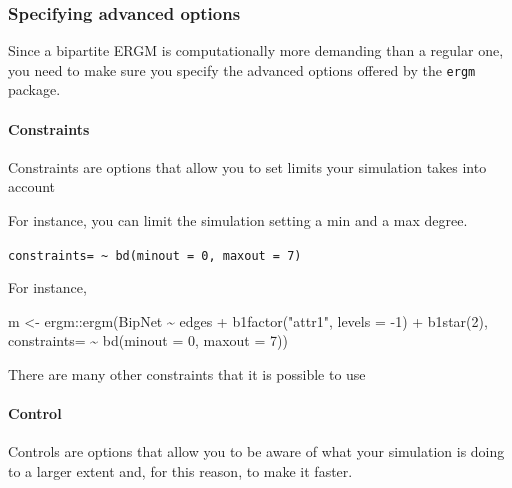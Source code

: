 \documentclass[
]{article}
\newenvironment{Shaded}{\begin{snugshade}}{\end{snugshade}}
\newcommand{\AttributeTok}[1]{\textcolor[rgb]{0.77,0.63,0.00}{#1}}
\newcommand{\DecValTok}[1]{\textcolor[rgb]{0.00,0.00,0.81}{#1}}
\newcommand{\FunctionTok}[1]{\textcolor[rgb]{0.00,0.00,0.00}{#1}}
\newcommand{\NormalTok}[1]{#1}
\newcommand{\OtherTok}[1]{\textcolor[rgb]{0.56,0.35,0.01}{#1}}
\newcommand{\SpecialCharTok}[1]{\textcolor[rgb]{0.00,0.00,0.00}{#1}}
\newcommand{\StringTok}[1]{\textcolor[rgb]{0.31,0.60,0.02}{#1}}
\begin{document}
\hypertarget{specifying-advanced-options}{%
\subsubsection{Specifying advanced
options}\label{specifying-advanced-options}}

Since a bipartite ERGM is computationally more demanding than a regular
one, you need to make sure you specify the advanced options offered by
the \texttt{ergm} package.

\hypertarget{constraints}{%
\paragraph{Constraints}\label{constraints}}

Constraints are options that allow you to set limits your simulation
takes into account

For instance, you can limit the simulation setting a min and a max
degree.

\texttt{constraints=\ \textasciitilde{}\ bd(minout\ =\ 0,\ maxout\ =\ 7)}

For instance,

\begin{Shaded}
\begin{Highlighting}[]
\NormalTok{m }\OtherTok{\textless{}{-}}\NormalTok{ ergm}\SpecialCharTok{::}\FunctionTok{ergm}\NormalTok{(BipNet }\SpecialCharTok{\textasciitilde{}}\NormalTok{ edges  }\SpecialCharTok{+} \FunctionTok{b1factor}\NormalTok{(}\StringTok{"attr1"}\NormalTok{, }\AttributeTok{levels =} \SpecialCharTok{{-}}\DecValTok{1}\NormalTok{) }\SpecialCharTok{+} \FunctionTok{b1star}\NormalTok{(}\DecValTok{2}\NormalTok{),}
                 \AttributeTok{constraints=} \SpecialCharTok{\textasciitilde{}} \FunctionTok{bd}\NormalTok{(}\AttributeTok{minout =} \DecValTok{0}\NormalTok{, }\AttributeTok{maxout =} \DecValTok{7}\NormalTok{))}
\end{Highlighting}
\end{Shaded}

There are many other constraints that it is possible to use

\hypertarget{control}{%
\paragraph{Control}\label{control}}

Controls are options that allow you to be aware of what your simulation
is doing to a larger extent and, for this reason, to make it faster.
\end{document}
